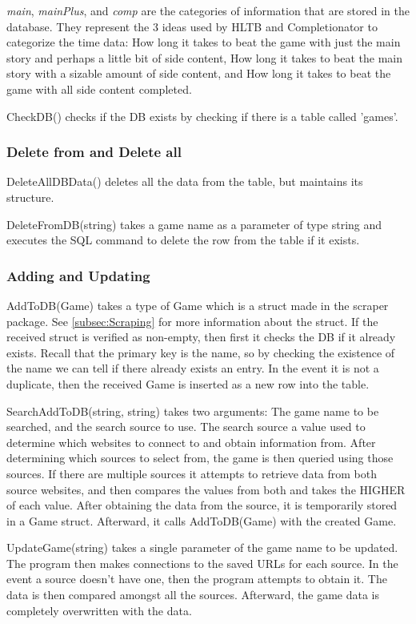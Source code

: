 \textit{main}, \textit{mainPlus}, and \textit{comp} are the
categories of information that are stored in the database. They
represent the 3 ideas used by HLTB and Completionator to categorize
the time data:
How long it takes to beat the game with just the main story and
perhaps a little bit of side content, How long it takes to beat the
main story with a sizable amount of side content, and How long
it takes to beat the game with all side content completed.

CheckDB() checks if the DB exists by checking if there is a table
called 'games'.

\subsubsection{Delete from and Delete all}

DeleteAllDBData() deletes all the data from the table, but maintains
its structure.

DeleteFromDB(string) takes a game name as a parameter of type string
and executes the SQL command to delete the row from the table if it exists.

\subsubsection{Adding and Updating}

AddToDB(Game) takes a type of Game which is a struct made in the
scraper package. See \ref{subsec:Scraping} for more information
about the struct. If the received struct is verified as non-empty,
then first it checks the DB if it already exists. Recall that the
primary key is the name, so by checking the existence of the name we
can tell if there already exists an entry.
In the event it is not a duplicate, then the received Game is
inserted as a new row into the table.

SearchAddToDB(string, string) takes two arguments: The game name to
be searched, and the search source to use. The search source a value
used to determine which websites to connect to and obtain information from.
After determining which sources to select from, the game is then
queried using those sources. If there are multiple sources it
attempts to retrieve data from both source websites, and then
compares the values from both and takes the HIGHER of each value.
After obtaining the data from the source, it is temporarily stored in
a Game struct. Afterward, it calls AddToDB(Game) with the created Game.

UpdateGame(string) takes a single parameter of the game name to be updated.
The program then makes connections to the saved URLs for each source.
In the event a source doesn't have one, then the program attempts to obtain it.
The data is then compared amongst all the sources.
Afterward, the game data is completely overwritten with the data.

